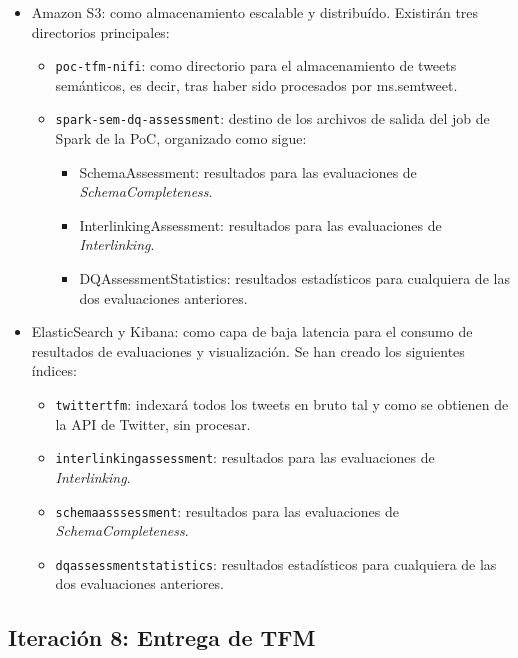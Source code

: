 \begin{itemize}
\item Amazon S3: como almacenamiento escalable y distribuído. Existirán tres
  directorios principales: 
  \begin{itemize}
  \item \texttt{poc-tfm-nifi}: como directorio para el almacenamiento de tweets
    semánticos, es decir, tras haber sido procesados por ms.semtweet.
  \item \texttt{spark-sem-dq-assessment}: destino de los archivos de salida del
    job de Spark de la \acs{PoC}, organizado como sigue:
    \begin{itemize}
    \item SchemaAssessment: resultados para las evaluaciones de
      \textit{SchemaCompleteness}. 
    \item InterlinkingAssessment: resultados para las evaluaciones de \textit{Interlinking}.
    \item DQAssessmentStatistics: resultados estadísticos para cualquiera de las
      dos evaluaciones anteriores. 
    \end{itemize}
  \end{itemize}
\item ElasticSearch y Kibana: como capa de baja latencia para el consumo de
  resultados de evaluaciones y visualización. Se han creado los siguientes
  índices:



  \begin{itemize}

  \item \texttt{twittertfm}: indexará todos los tweets en bruto tal y como se
    obtienen de la \acs{API} de Twitter, sin procesar. 

  \item \texttt{interlinkingassessment}: resultados para las evaluaciones de
    \textit{Interlinking}. 
  \item \texttt{schemaasssessment}: resultados para las evaluaciones de
    \textit{SchemaCompleteness}.
  \item \texttt{dqassessmentstatistics}: resultados estadísticos para cualquiera
    de las dos evaluaciones anteriores. 
  \end{itemize}


\end{itemize}


\subsection{Iteración 8: Entrega de TFM}

